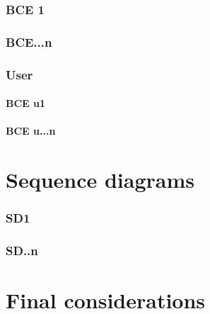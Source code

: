 \documentclass[10pt,a4paper,titlepage]{article}
\begin{document}
\section{BCE 1}
\section{BCE...n}
\section{User}
\subsection{BCE u1}
\subsection{BCE u...n}

\clearpage
\part{Sequence diagrams}
\section{SD1}
\section{SD..n}

\clearpage
\part{Final considerations}

\clearpage
\tableofcontents
\end{document}
